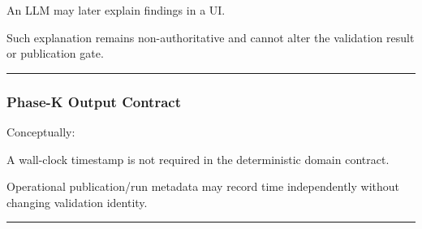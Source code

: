 An LLM may later explain findings in a UI.

Such explanation remains non-authoritative and cannot alter the validation result or publication gate.

\begin{center}\rule{0.5\linewidth}{0.5pt}\end{center}

\hypertarget{phase-k-output-contract}{%
\subsubsection{Phase-K Output Contract}\label{phase-k-output-contract}}

Conceptually:

\begin{Shaded}
\begin{Highlighting}[]
\OperatorTok{=}\OperatorTok{=}\NormalTok{)}



        \NormalTok{[SysMLExternalValidationEvidence, ...]}
\NormalTok{    )}

\NormalTok{[SysMLValidationFinding, ...]}


\end{Highlighting}
\end{Shaded}

A wall-clock timestamp is not required in the deterministic domain contract.

Operational publication/run metadata may record time independently without changing validation identity.

\begin{center}\rule{0.5\linewidth}{0.5pt}\end{center}

